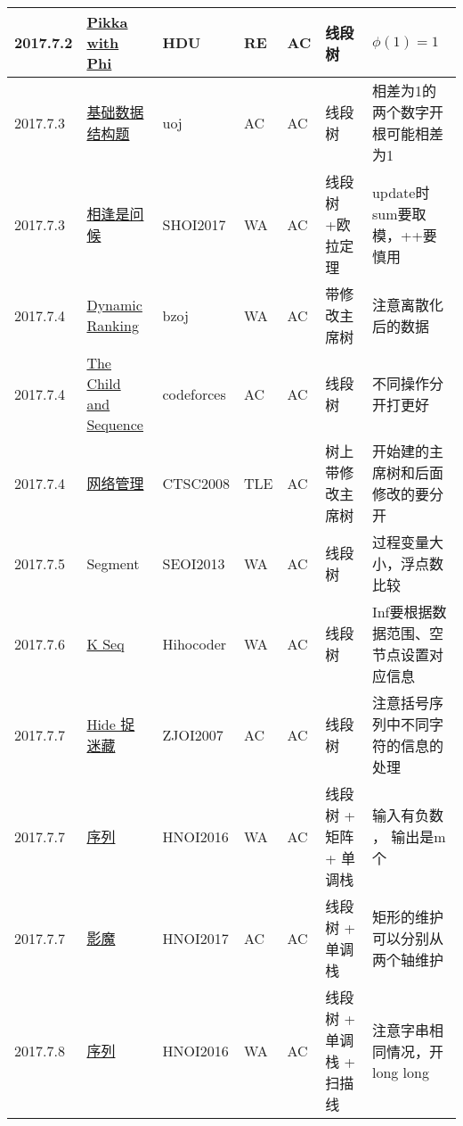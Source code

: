 \documentclass[a4paper]{article}
\begin{document}
\begin{longtable}{|p{1.5cm}|p{2.5cm}|p{1.6cm}|p{1.6cm}|p{1cm}|p{3cm}|p{4cm}|}
		\hline
		2017.7.2 & \href {https://vjudge.net/problem/HDU-5634}{Pikka with Phi}
		 & HDU & RE & AC & 线段树 & $\phi(1) = 1$\\
		
		\hline
		2017.7.3 & \href {http://uoj.ac/problem/228}{基础数据结构题}
		 & uoj & AC & AC & 线段树 & 相差为1的两个数字开根可能相差为1\\
		
		\hline
		2017.7.3 & \href {http://www.lydsy.com/JudgeOnline/problem.php?id=4869}{相逢是问候}
		 & SHOI2017 & WA & AC & 线段树+欧拉定理 & update时sum要取模，++要慎用\\
		
		\hline
		2017.7.4 & \href {http://www.lydsy.com/JudgeOnline/problem.php?id=1901}{Dynamic Ranking}
		 & bzoj & WA & AC & 带修改主席树 & 注意离散化后的数据\\
		
		\hline
		2017.7.4 & \href {http://codeforces.com/problemset/problem/438/D}{The Child and Sequence}
		 & codeforces & AC & AC & 线段树 & 不同操作分开打更好\\
		
		\hline
		2017.7.4 & \href {http://www.lydsy.com/JudgeOnline/problem.php?id=1146}{网络管理}
		 & CTSC2008 & TLE & AC & 树上带修改主席树 & 开始建的主席树和后面修改的要分开\\
		
		
		\hline
		2017.7.5 & Segment
		 & SEOI2013 & WA & AC & 线段树 & 过程变量大小，浮点数比较\\
		 
		\hline
		2017.7.6 & \href {https://hihocoder.com/problemset/problem/1046}{K Seq}
		 & Hihocoder & WA & AC & 线段树 & Inf要根据数据范围、空节点设置对应信息 \\
		
		\hline
		2017.7.7 & \href {http://www.lydsy.com/JudgeOnline/problem.php?id=1095}{Hide 捉迷藏}
		 & ZJOI2007 & AC & AC & 线段树 & 注意括号序列中不同字符的信息的处理\\
		
		\hline
		2017.7.7 & \href {http://www.lydsy.com/JudgeOnline/problem.php?id=4540}{序列}
		 & HNOI2016 & WA & AC & 线段树 + 矩阵 + 单调栈 & 输入有负数 ， 输出是m个\\
		
		\hline
		2017.7.7 & \href {http://www.lydsy.com/JudgeOnline/problem.php?id=4826}{影魔}
		 & HNOI2017 & AC & AC & 线段树 + 单调栈 & 矩形的维护可以分别从两个轴维护 \\
		
		\hline
		2017.7.8 & \href {http://www.lydsy.com/JudgeOnline/problem.php?id=4540}{序列}
		 & HNOI2016 & WA & AC & 线段树 + 单调栈 + 扫描线 & 注意字串相同情况，开long long\\
		

\end{longtable}
\end{document}
